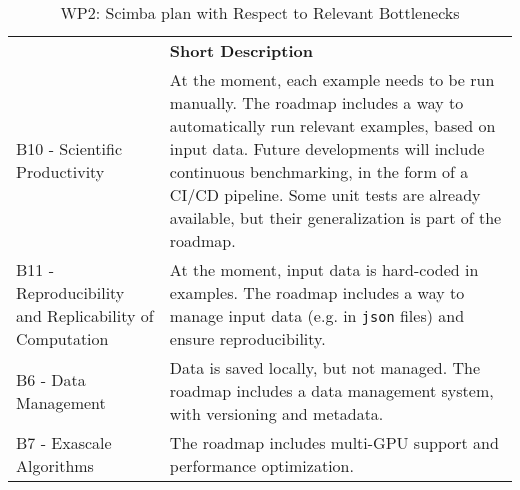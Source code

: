 \begin{table}[h!]
    \centering
    {
        \setlength{\parindent}{0pt}
        \def\arraystretch{1.25}
        {
            \fontsize{9}{11}\selectfont
            \begin{tabular}{!{\color{numpexgray}\vrule}p{.25\linewidth}!{\color{numpexgray}\vrule}p{.6885\linewidth}!{\color{numpexgray}\vrule}}

                 & {\rule{0pt}{2.5ex}\color{white}\bf Short Description } \\

                B10 - Scientific Productivity
                 & At the moment, each example needs to be run manually.
                The roadmap includes a way to automatically
                run relevant examples, based on input data.
                Future developments will include continuous benchmarking,
                in the form of a CI/CD pipeline.
                Some unit tests are already available,
                but their generalization is part of the roadmap.          \\
                B11 - Reproducibility and Replicability of Computation
                 & At the moment, input data is hard-coded in examples.
                The roadmap includes a way to manage input data
                (e.g. in \texttt{json} files)
                and ensure reproducibility.                               \\
                B6 - Data Management
                 & Data is saved locally, but not managed.
                The roadmap includes a data management system,
                with versioning and metadata.                             \\
                B7 - Exascale Algorithms
                 & The roadmap includes multi-GPU support
                and performance optimization.                             \\
            \end{tabular}
        }
    }
    \caption{WP2: Scimba plan with Respect to Relevant Bottlenecks}
    \label{tab:WP2:Scimba:bottlenecks}
\end{table}

